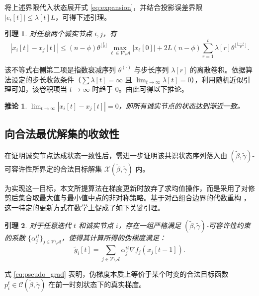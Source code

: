 \documentclass[12pt,hyperref,a4paper,UTF8]{ctexart}
\newtheorem{lemma}{引理}[section]
\newtheorem{corollary}{推论}[section]
\numberwithin{equation}{section}
\numberwithin{figure}{section}
\numberwithin{table}{section}
\begin{document}
将上述界限代入状态展开式 \eqref{eq:expansion}，并结合投影误差界限 $|e_i[t]| \le \lambda[t]L$，可得下述引理。

\begin{lemma}\label{lem:2}
    对任意两个诚实节点 $i, j$，有
    \begin{equation}
        |x_i[t] - x_j[t]| \le (n - \phi)\theta^{\lfloor \frac{t}{\nu} \rfloor} \max_{\ell \in \mathcal{V}\setminus\mathcal{A}}|x_\ell[0]| + 2L(n - \phi)\sum_{r=1}^t \lambda[r]\theta^{\lfloor \frac{t-r}{\nu} \rfloor}.
    \end{equation}
\end{lemma}

该不等式右侧第二项是指数衰减序列 $\theta^{(\cdot)}$ 与步长序列 $\lambda[r]$ 的离散卷积。依据算法设定的步长收敛条件（$\sum \lambda[t] = \infty$ 且 $\lim_{t \to \infty}\lambda[t] = 0$），利用随机近似引理可知，该卷积项当 $t \to \infty$ 时趋于 $0$。由此可得以下推论。

\begin{corollary}\label{cor:1}
    $\lim_{t \to \infty} |x_i[t] - x_j[t]| = 0$，即所有诚实节点的状态达到渐近一致。
\end{corollary}

\subsection{向合法最优解集的收敛性}
\quad \quad  在证明诚实节点达成状态一致性后，需进一步证明该共识状态序列落入由 $(\tilde{\beta}, \tilde{\gamma})$-可容许性所界定的合法目标解集 $\mathcal{X}(\tilde{\beta}, \tilde{\gamma})$ 内。

为实现这一目标，本文所提算法在梯度更新时放弃了求均值操作，而是采用了对修剪后集合取最大值与最小值中点的非对称策略。基于对凸组合边界的代数重构 \cite{su2016fault}，这一特定的更新方式在数学上促成了如下关键引理。

\begin{lemma}\label{lem:3}
    对于任意迭代 $t$ 和诚实节点 $i$，存在一组严格满足 $(\tilde{\beta}, \tilde{\gamma})$-可容许性约束的系数 $\{\alpha_j^{it}\}_{j \in \mathcal{V} \setminus \mathcal{A}}$，使得其计算所得的伪梯度满足：
    \begin{equation} \label{eq:pseudo_grad}
        \tilde{g}_i[t] = \sum_{j \in \mathcal{V} \setminus \mathcal{A}} \alpha_j^{it} \nabla f_j(x_j[t-1]).
    \end{equation}
\end{lemma}

式 \eqref{eq:pseudo_grad} 表明，伪梯度本质上等价于某个时变的合法目标函数 $p_i^t \in \mathcal{C}(\tilde{\beta}, \tilde{\gamma})$ 在前一时刻状态下的真实梯度。
\end{document}
